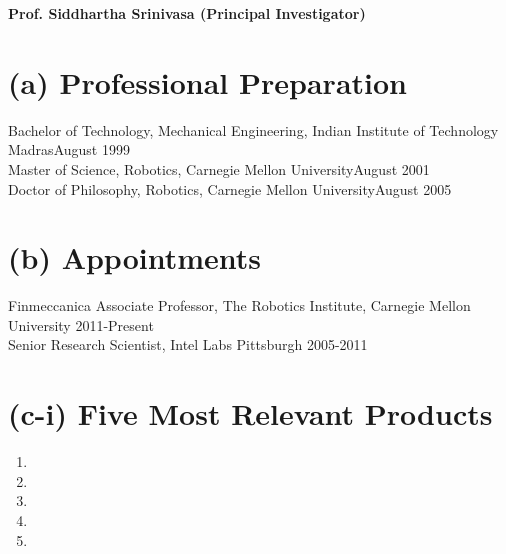 \documentclass[10pt]{article}
\newcommand{\svn}[1]{\svnsub#1}
\def\svnsub$#1${#1}
\begin{document}
\pagestyle{empty} %

\par{\centering
		{\bf\LARGE Prof. Siddhartha Srinivasa (Principal Investigator)
	}\bigskip\par}





\section{(a) Professional Preparation}
\noindent
Bachelor of Technology, Mechanical Engineering, Indian Institute of Technology Madras\hfill August 1999\\
Master of Science, Robotics, Carnegie Mellon University\hfill August 2001\\
Doctor of Philosophy, Robotics, Carnegie Mellon University\hfill August 2005\\

\section{(b) Appointments}
\noindent
Finmeccanica Associate Professor, The Robotics Institute, Carnegie Mellon University \hfill 2011-Present\\
Senior Research Scientist, Intel Labs Pittsburgh \hfill 2005-2011\\

\section{(c-i) Five Most Relevant Products}
\renewcommand{\labelenumi}{[ \arabic{enumi} ]\hfill}
\begin{enumerate}

\item {}

\item {}

\item {}

\item {}

\item {}


\end{enumerate}
\end{document}
